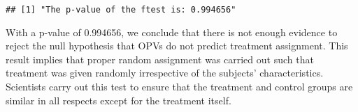 \documentclass[
]{article}
\newenvironment{Shaded}{\begin{snugshade}}{\end{snugshade}}
\newcommand{\AttributeTok}[1]{\textcolor[rgb]{0.13,0.29,0.53}{#1}}
\newcommand{\CommentTok}[1]{\textcolor[rgb]{0.56,0.35,0.01}{\textit{#1}}}
\newcommand{\DecValTok}[1]{\textcolor[rgb]{0.00,0.00,0.81}{#1}}
\newcommand{\FunctionTok}[1]{\textcolor[rgb]{0.13,0.29,0.53}{\textbf{#1}}}
\newcommand{\NormalTok}[1]{#1}
\newcommand{\OtherTok}[1]{\textcolor[rgb]{0.56,0.35,0.01}{#1}}
\newcommand{\SpecialCharTok}[1]{\textcolor[rgb]{0.81,0.36,0.00}{\textbf{#1}}}
\newcommand{\StringTok}[1]{\textcolor[rgb]{0.31,0.60,0.02}{#1}}
\begin{document}
\begin{Shaded}
\end{Shaded}

\begin{verbatim}
## [1] "The p-value of the ftest is: 0.994656"
\end{verbatim}

With a p-value of 0.994656, we conclude that there is not enough
evidence to reject the null hypothesis that OPVs do not predict
treatment assignment. This result implies that proper random assignment
was carried out such that treatment was given randomly irrespective of
the subjects' characteristics. Scientists carry out this test to ensure
that the treatment and control groups are similar in all respects except
for the treatment itself.
\end{document}
